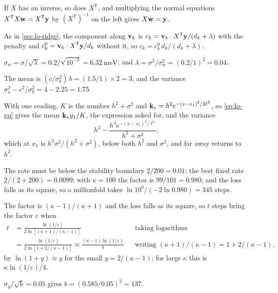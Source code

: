 If $X$ has an inverse, so does $X^{\mathsf T}$,
and multiplying the normal equations $X^{\mathsf T}X\bm{\mathrm{w}} = X^{\mathsf
T}\bm{\mathrm{y}}$ by $(X^{\mathsf T})^{-1}$ on the left gives $X\bm{\mathrm{w}} = \bm{\mathrm{y}}$.

As in \cref{sec:lo-ridge}, the component along
$\bm{\mathrm{v}}_k$ is $c_k = \bm{\mathrm{v}}_k\cdot X^{\mathsf T}\bm{\mathrm{y}}/(d_k + \lambda)$
with the penalty and $c_k^0 = \bm{\mathrm{v}}_k\cdot X^{\mathsf T}\bm{\mathrm{y}}/d_k$
without it, so $c_k = c_k^0\,d_k/(d_k + \lambda)$.

$\sigma_w = \sigma/\sqrt\lambda =
0.2/\sqrt{10^{-3}} = \SI{6.32}{\milli\electronvolt}$; and $\lambda =
\sigma^2/\sigma_w^2 = (0.2/1)^2 = 0.04$.

The mean is $(c/\sigma_b^2)\,b = (1.5/1)\times
2 = 3$, and the variance $\sigma_a^2 - c^2/\sigma_b^2 = 4 - 2.25 = 1.75$.

With one reading, $K$ is the number $h^2 +
\sigma^2$ and $\bm{\mathrm{k}}_\ast = h^2\mathrm{e}^{-(x - x_1)^2/2\ell^2}$, so
\cref{eq:lo-gp} gives the mean $\bm{\mathrm{k}}_\ast y_1/K$, the expression asked
for, and the variance
\begin{equation*}
   h^2 - \frac{h^4\mathrm{e}^{-(x - x_1)^2/\ell^2}}{h^2 + \sigma^2} ,
\end{equation*}
which at $x_1$ is $h^2\sigma^2/(h^2 + \sigma^2)$, below both $h^2$ and
$\sigma^2$, and far away returns to $h^2$.

The rate must be below the stability boundary $2/200 = 0.01$; the best
fixed rate $2/(2 + 200) = 0.0099$; with $\kappa = 100$ the factor is $99/
101 = 0.980$; and the loss falls as its square, so a millionfold takes
$\ln10^6/(-2\ln0.980) = 345$ steps.

The factor is $(\kappa - 1)/(\kappa + 1)$ and the
loss falls as its square, so $t$ steps bring the factor $\varepsilon$ when
\begin{align*}
   t &= \frac{\ln(1/\varepsilon)}{2\ln[(\kappa + 1)/(\kappa - 1)]}
      && \text{taking logarithms}\\
   &= \frac{\ln(1/\varepsilon)}{2\ln[1 + 2/(\kappa - 1)]}
   \approx \frac{(\kappa - 1)\ln(1/\varepsilon)}{4}
      && \text{writing $(\kappa + 1)/(\kappa - 1) = 1 + 2/(\kappa - 1)$,}
\end{align*}
by $\ln(1 + y) \approx y$ for the small $y = 2/(\kappa - 1)$; for large
$\kappa$ this is $\kappa\ln(1/\varepsilon)/4$.

$\sigma_g/\sqrt b = 0.05$ gives $b = (0.585/0.05)^2
= 137$.


